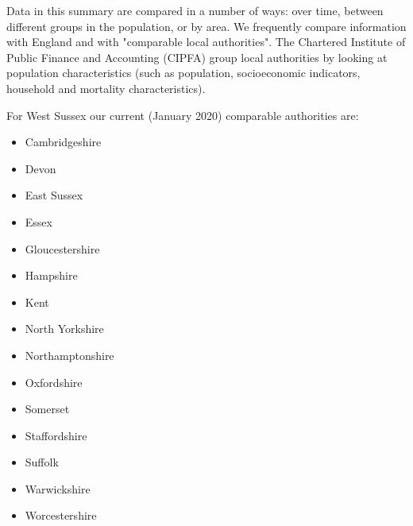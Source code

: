 \begin{tcolorbox}[title={CIPFA Neighbours}, colback={boxcolour}]
Data in this summary are compared in a number of ways: over time, between different groups in the population, or by area. We frequently compare information with England and with "comparable local authorities". The Chartered Institute of Public Finance and Accounting (CIPFA) group local authorities by looking at population characteristics (such as population, socioeconomic indicators, household and mortality characteristics).

For West Sussex our current (January 2020) comparable authorities are:
\small
\begin{multicols}{3}
\begin{itemize}
    \item Cambridgeshire
    \item Devon
    \item East Sussex
    \item Essex
    \item Gloucestershire
    \item Hampshire
    \item Kent
    \item North Yorkshire
    \item Northamptonshire
    \item Oxfordshire
    \item Somerset
    \item Staffordshire
    \item Suffolk
    \item Warwickshire
    \item Worcestershire
\end{itemize}
\end{multicols}
\end{tcolorbox}


